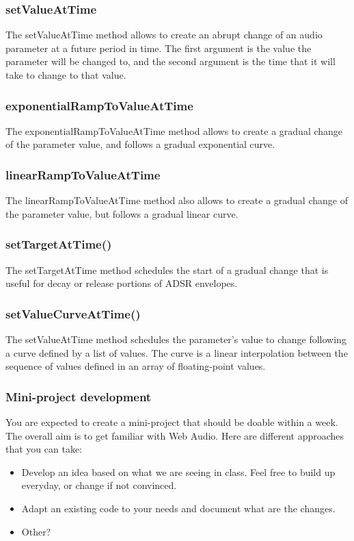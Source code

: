 \documentclass[screen, aspectratio=43]{beamer}
\begin{document}
%
\begin{frame}
\frametitle{setValueAtTime}
The \textrm{setValueAtTime} method allows to create an abrupt change of an audio parameter at a future period in time.  The first argument is the value the parameter will be changed to, and the second argument is the time that it will take to change to that value.
\end{frame}
%
\begin{frame}
\frametitle{exponentialRampToValueAtTime }
The \textrm{exponentialRampToValueAtTime} method allows to create a gradual change of the parameter value, and follows a gradual exponential curve.

\end{frame}
%
\begin{frame}
\frametitle{linearRampToValueAtTime}
The \textrm{linearRampToValueAtTime} method also allows to create a gradual change of the parameter value, but follows a gradual linear curve.
\end{frame}
%
\begin{frame}
\frametitle{setTargetAtTime()}
The \textrm{setTargetAtTime} method schedules the start of a gradual change that is useful for decay or release portions of ADSR envelopes.
\end{frame}
%
\begin{frame}
\frametitle{setValueCurveAtTime()}
The \textrm{setValueAtTime} method schedules the parameter's value to change following a curve defined by a list of values. The curve is a linear interpolation between the sequence of values defined in an array of floating-point values.
\end{frame}
%	
\begin{frame}
\frametitle{Mini-project development}
You are expected to create a mini-project that should be doable within a week. The overall aim is to get familiar with Web Audio. Here are different approaches that you can take:
\begin{itemize}
\item Develop an idea based on what we are seeing in class. Feel free to build up everyday, or change if not convinced.
\item Adapt an existing code to your needs and document what are the changes.
\item Other?
\end{itemize}
\end{frame}
\end{document}
